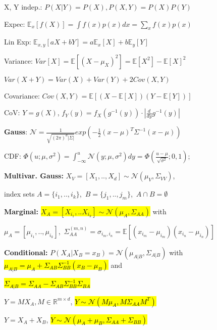 \documentclass[11pt,landscape,a4paper,fleqn]{article}
\newcommand{\mhl}[1]{\setlength{\fboxsep}{0pt}\colorbox{yellow}{#1}}
\begin{document}
\begin{multicols*}{4}
X, Y indep.: $P(X|Y) = P(X), P(X,Y) = P(X) P(Y)$

Expec: $\mathbb{E}_x[f(X)] = \int f(x)p(x)dx = \sum_x f(x)p(x)$

Lin Exp: $\mathbb{E}_{x,y}[aX + bY] = a\mathbb{E}_x[X] + b \mathbb{E}_y[Y]$

Variance: $Var[X] = \mathbb{E}[(X-\mu_X)^2] = \mathbb{E}[X^2] - \mathbb{E}[X]^2$

$Var(X + Y) = Var(X) + Var(Y) + 2Cov(X,Y)$

Covariance: $Cov(X, Y) = \mathbb{E}[(X - \mathbb{E}[X])(Y - \mathbb{E}[Y])]$

CoV: $Y = g(X)$, $f_Y(y) = f_X(g^{-1}(y)) \cdot |\frac{d}{dy} g^{-1}(y)|$

\textbf{Gauss}: \mbox{\fontsize{10}{6}\selectfont $\mathcal{N} = \frac{1}{\sqrt{(2\pi)^d |\Sigma|}}exp(-\frac{1}{2}(x-\mu)^T\Sigma^{-1} (x-\mu))$}

CDF: \mbox{\fontsize{9}{6}\selectfont $\Phi(u;\mu,\sigma^2) = \int_{-\infty}^{u}\mathcal{N}(y;\mu,\sigma^2)dy=\Phi(\frac{u-\mu}{\sqrt{\sigma^2}};0,1)$;}

\textbf{Multivar. Gauss:}
\mbox{\fontsize{10}{6}\selectfont $X_V = [X_1, .., X_d] \sim \mathcal{N}(\mu_V, \Sigma_{VV})$},

index sets \mbox{\fontsize{9}{6}\selectfont $A = \{i_1,..,i_k\}$, $B = \{j_1,..,j_m\}$, $A \cap B = \emptyset$}

\textbf{Marginal:} \mhl{$X_A = [X_{i_1},..X_{i_k}] \sim \mathcal{N}(\mu_A, \Sigma_{AA})$} with

\mbox{\fontsize{8.8}{6}\selectfont $\mu_A = [\mu_{i_1},..,\mu_{i_k}]$, $\Sigma_{AA}^{(m,n)} = \sigma_{i_m,i_n} = \mathbb{E}[(x_{i_m} - \mu_{i_m}) (x_{i_n} - \mu_{i_n})]$}

\textbf{Conditional:} $P(X_A | X_B = x_B) = \mathcal{N}(\mu_{A|B}, \Sigma_{A|B})$ with \hl{$\mu_{A|B} = \mu_A + \Sigma_{AB} \Sigma_{BB}^{-1} (x_B - \mu_B)$} and 

\hl{$\Sigma_{A|B} = \Sigma_{AA} - \Sigma_{AB} \Sigma_{BB}^{-1} \Sigma_{BA}$}

$Y = M X_A, M \in \mathbb{R}^{m \times d}$, \hl{$Y \sim \mathcal{N}(M\mu_A, M\Sigma_{AA}M^T)$}

$Y = X_A + X_B$, \hl{$Y \sim \mathcal{N}(\mu_A + \mu_B, \Sigma_{AA} + \Sigma_{BB})$}



\end{multicols*}
\end{document}
